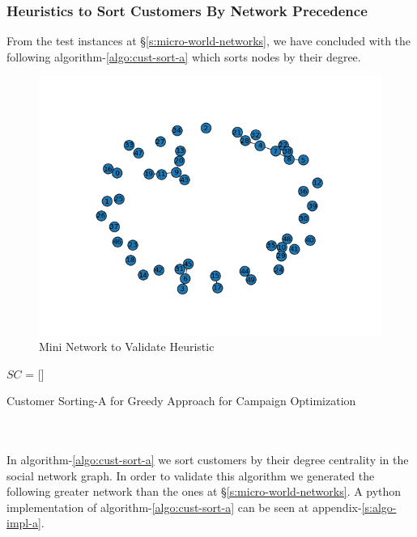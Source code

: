 \documentclass[11pt]{article}
\begin{document}
\subsubsection{Heuristics to Sort Customers By Network Precedence \label{s:heu-camp-opt-with-net}}

From the test instances at \S \ref{s:micro-world-networks}, we have concluded with the following algorithm-\ref{algo:cust-sort-a} which sorts nodes by their degree.

\begin{figure}[h!]
    \centering
    \includegraphics[width=12cm]{mini_world_case.png}
    \caption{Mini Network to Validate Heuristic}
    \label{fig:fig_mini_world_case}
\end{figure}

\begin{algorithm}[H]
\DontPrintSemicolon
{}
$SC$ = []\;
\;
\caption{Customer Sorting-A for Greedy Approach for Campaign Optimization}
\label{algo:cust-sort-a}
\end{algorithm}
\\
\hbox{}
\\
In algorithm-\ref{algo:cust-sort-a} we sort customers by their degree centrality in the social network graph. In order to validate this algorithm we generated the following greater network than the ones at \S \ref{s:micro-world-networks}. A python implementation of algorithm-\ref{algo:cust-sort-a} can be seen at appendix-\ref{s:algo-impl-a}.\\
\end{document}
